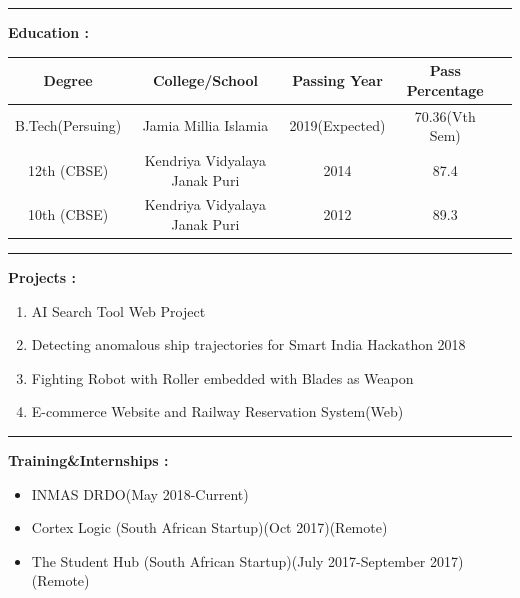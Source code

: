 \documentclass[11pt,a4paper]{article}
\begin{document}
\hfill
\hrule
\begin{multicols}{2}
	\begin{minipage}{0.15\paperwidth}
		\textbf{Education : }
	\end{minipage}
	\begin{minipage}{0.7\paperwidth}
		\renewcommand{\arraystretch}{2}
		\begin{tabular}{|c|c|c|c|c|}
			\hline
			Degree&College\//School&Passing Year&Pass Percentage\\
			\hline
			B.Tech(Persuing)&Jamia Millia Islamia&2019(Expected)&70.36(Vth Sem)\\
			\hline
			12th (CBSE)&Kendriya Vidyalaya Janak Puri&2014&87.4\\
			\hline
			10th (CBSE)&Kendriya Vidyalaya Janak Puri&2012&89.3\\
			\hline
		\end{tabular}
	\end{minipage}
\end{multicols}
\hfill
\hrule
\begin{multicols}{2}
	\begin{minipage}{0.15\paperwidth}
		\textbf{Projects :}
	\end{minipage}
	\begin{minipage}{0.7\paperwidth}
		\begin{enumerate}
			\item AI Search Tool Web Project 
			\item Detecting anomalous ship trajectories for Smart India Hackathon 2018
			\item Fighting Robot with Roller embedded with Blades as Weapon
			\item E-commerce Website and Railway Reservation System(Web)
		\end{enumerate}
	\end{minipage}
\end{multicols}
\hfill
\hrule
\begin{multicols}{2}
	\begin{minipage}{0.16\paperwidth}
		\textbf{Training\&\linebreak Internships :}
	\end{minipage}
	\begin{minipage}{0.7\paperwidth}
		\begin{itemize}
			\item INMAS DRDO(May 2018-Current)
			\item Cortex Logic (South African Startup)(Oct 2017)(Remote)
			\item The Student Hub (South African Startup)(July 2017-September 2017)(Remote)
		\end{itemize}
	\end{minipage}
\end{multicols}
\end{document}
